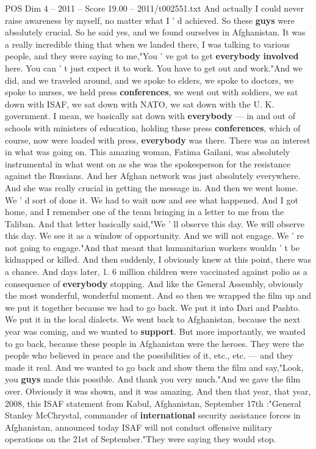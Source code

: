 \begin{textsample}{POS Dim 4 – 2011 – Score 19.00 – 2011/t002551.txt}
And actually I could never raise awareness by myself, no matter what I ' d achieved.
So these \textbf{guys} were absolutely crucial.
So he said yes, and we found ourselves in Afghanistan.
It was a really incredible thing that when we landed there, I was talking to various people, and they were saying to me,"You ' ve got to get \textbf{everybody} \textbf{involved} here.
You can ' t just expect it to work.
You have to get out and work."And we did, and we traveled around, and we spoke to elders, we spoke to doctors, we spoke to nurses, we held press \textbf{conferences}, we went out with soldiers, we sat down with ISAF, we sat down with NATO, we sat down with the U.
K. government.
I mean, we basically sat down with \textbf{everybody} — in and out of schools with ministers of education, holding these press \textbf{conferences}, which of course, now were loaded with press, \textbf{everybody} was there.
There was an interest in what was going on.
This amazing woman, Fatima Gailani, was absolutely instrumental in what went on as she was the spokesperson for the resistance against the Russians.
And her Afghan network was just absolutely everywhere.
And she was really crucial in getting the message in.
And then we went home.
We ' d sort of done it.
We had to wait now and see what happened.
And I got home, and I remember one of the team bringing in a letter to me from the Taliban.
And that letter basically said,"We ' ll observe this day.
We will observe this day.
We see it as a window of opportunity.
And we will not engage.
We ' re not going to engage."And that meant that humanitarian workers wouldn ' t be kidnapped or killed.
And then suddenly, I obviously knew at this point, there was a chance.
And days later, 1. 6 million children were vaccinated against polio as a consequence of \textbf{everybody} stopping.
And like the General Assembly, obviously the most wonderful, wonderful moment.
And so then we wrapped the film up and we put it together because we had to go back.
We put it into Dari and Pashto.
We put it in the local dialects.
We went back to Afghanistan, because the next year was coming, and we wanted to \textbf{support}.
But more importantly, we wanted to go back, because these people in Afghanistan were the heroes.
They were the people who believed in peace and the possibilities of it, etc., etc. — and they made it real.
And we wanted to go back and show them the film and say,"Look, you \textbf{guys} made this possible.
And thank you very much."And we gave the film over.
Obviously it was shown, and it was amazing.
And then that year, that year, 2008, this ISAF statement from Kabul, Afghanistan, September 17th :"General Stanley McChrystal, commander of \textbf{international} security assistance forces in Afghanistan, announced today ISAF will not conduct offensive military operations on the 21st of September."They were saying they would stop.

\end{textsample}
